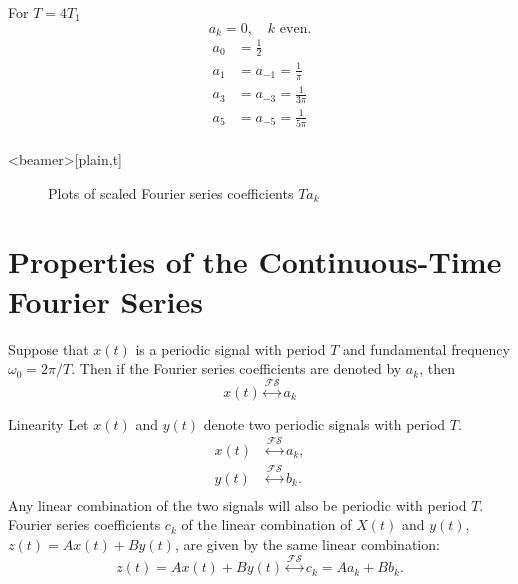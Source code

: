 \begin{frame}
    {
    For $T=4T_1$
    \begin{equation*}
        a_k = 0, \quad k \text{ even}.
    \end{equation*}
    \begin{align*}
        a_0 &= \frac{1}{2}\\
        a_1 &= a_{-1} = \frac{1}{\pi}\\
        a_3 &= a_{-3} = \frac{1}{3\pi}\\
        a_5 &= a_{-5} = \frac{1}{5\pi}\\
    \end{align*}
    }
\end{frame}


\begin{frame}<beamer>[plain,t]
    \begin{figure}
      \centering
      
      \caption{Plots of scaled Fourier series coefficients $Ta_k$}\label{fi:example02_periodic_square_fs}
    \end{figure}
\end{frame}


\section{Properties of the Continuous-Time Fourier Series}

\begin{frame}
    Suppose that $x(t)$ is a periodic signal with period $T$ and fundamental frequency $\omega_0 = 2\pi/T$. Then if the Fourier series coefficients are denoted by $a_k$, then
    \begin{equation}
        x(t) \overset{\mathcal{FS}}{\longleftrightarrow} a_k
    \end{equation}
\end{frame}

\begin{frame}{Linearity}
    Let $x(t)$ and $y(t)$ denote two periodic signals with period $T$.
    \begin{align*}
        x(t) &\overset{\mathcal{FS}}{\longleftrightarrow} a_k,\\
        y(t) &\overset{\mathcal{FS}}{\longleftrightarrow} b_k.\\
    \end{align*}
    Any linear combination of the two signals will also be periodic with period $T$. Fourier series coefficients $c_k$ of the linear combination of $X(t)$ and $y(t)$, $z(t) = Ax(t) + By(t)$, are given by the same linear combination:
    \pause
    {
        \begin{equation}
            z(t) = Ax(t) + By(t)\overset{\mathcal{FS}}{\longleftrightarrow} c_k = Aa_k + Bb_k.
        \end{equation}
    }
\end{frame}

